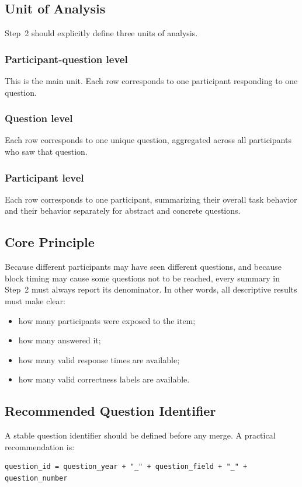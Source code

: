 \documentclass[11pt]{article}
\begin{document}
\subsection{Unit of Analysis}
Step~2 should explicitly define three units of analysis.

\subsubsection*{Participant-question level}
This is the main unit.
Each row corresponds to one participant responding to one question.

\subsubsection*{Question level}
Each row corresponds to one unique question, aggregated across all participants who saw that question.

\subsubsection*{Participant level}
Each row corresponds to one participant, summarizing their overall task behavior and their behavior separately for abstract and concrete questions.

\subsection{Core Principle}
Because different participants may have seen different questions, and because block timing may cause some questions not to be reached, every summary in Step~2 must always report its denominator.
In other words, all descriptive results must make clear:
\begin{itemize}
    \item how many participants were exposed to the item;
    \item how many answered it;
    \item how many valid response times are available;
    \item how many valid correctness labels are available.
\end{itemize}

\subsection{Recommended Question Identifier}
A stable question identifier should be defined before any merge.
A practical recommendation is:
\begin{verbatim}
question_id = question_year + "_" + question_field + "_" + question_number
\end{verbatim}
\end{document}
